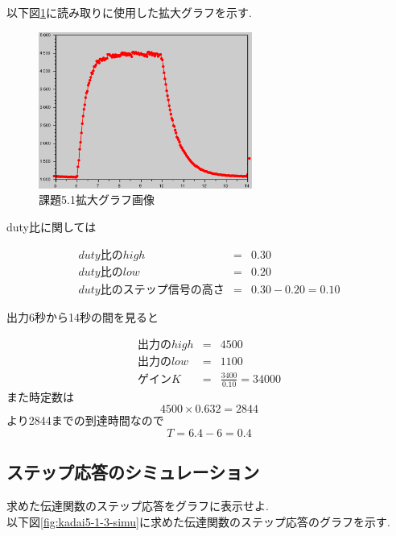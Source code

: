 \documentclass{jarticle}
\begin{document}
以下図\ref{fig:kadai5-1-3-expand}に読み取りに使用した拡大グラフを示す.

\begin{figure}[H]
\begin{center}
\includegraphics[width=7.0cm]{images/kadai5-1-3-expand.eps}
\caption{課題5.1拡大グラフ画像}
\label{fig:kadai5-1-3-expand}
\end{center}
\end{figure}

duty比に関しては

\begin{eqnarray}
duty比のhigh & = & 0.30 \\
duty比のlow &  = & 0.20 \\
duty比のステップ信号の高さ & = & 0.30 - 0.20 = 0.10
\end{eqnarray}

出力6秒から14秒の間を見ると

\begin{eqnarray}
出力のhigh & = & 4500 \\
出力のlow &  = & 1100 \\
ゲインK & = & \frac{3400}{0.10} = 34000
\end{eqnarray}
また時定数は
\begin{equation}
4500 \times 0.632  =  2844 
\end{equation}
より2844までの到達時間なので
\begin{equation}
T = 6.4 - 6 = 0.4
\end{equation}

\subsection{ステップ応答のシミュレーション}
求めた伝達関数のステップ応答をグラフに表示せよ. \\

以下図\ref{fig:kadai5-1-3-simu}に求めた伝達関数のステップ応答のグラフを示す.
\end{document}
